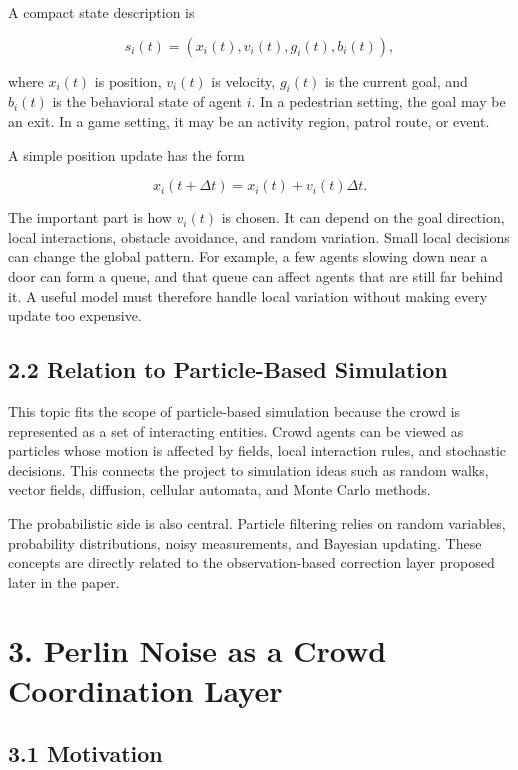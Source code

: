 \documentclass[
  11pt,
]{article}
\begin{document}
A compact state description is

\[
s_i(t) = \left(x_i(t), v_i(t), g_i(t), b_i(t)\right),
\]

where \(x_i(t)\) is position, \(v_i(t)\) is velocity, \(g_i(t)\) is the
current goal, and \(b_i(t)\) is the behavioral state of agent \(i\). In
a pedestrian setting, the goal may be an exit. In a game setting, it may
be an activity region, patrol route, or event.

A simple position update has the form

\[
x_i(t+\Delta t) = x_i(t) + v_i(t)\Delta t.
\]

The important part is how \(v_i(t)\) is chosen. It can depend on the
goal direction, local interactions, obstacle avoidance, and random
variation. Small local decisions can change the global pattern. For
example, a few agents slowing down near a door can form a queue, and
that queue can affect agents that are still far behind it. A useful
model must therefore handle local variation without making every update
too expensive.

\subsection{2.2 Relation to Particle-Based
Simulation}\label{relation-to-particle-based-simulation}

This topic fits the scope of particle-based simulation because the crowd
is represented as a set of interacting entities. Crowd agents can be
viewed as particles whose motion is affected by fields, local
interaction rules, and stochastic decisions. This connects the project
to simulation ideas such as random walks, vector fields, diffusion,
cellular automata, and Monte Carlo methods.

The probabilistic side is also central. Particle filtering relies on
random variables, probability distributions, noisy measurements, and
Bayesian updating. These concepts are directly related to the
observation-based correction layer proposed later in the paper.

\section{3. Perlin Noise as a Crowd Coordination
Layer}\label{perlin-noise-as-a-crowd-coordination-layer}

\subsection{3.1 Motivation}\label{motivation}
\end{document}
